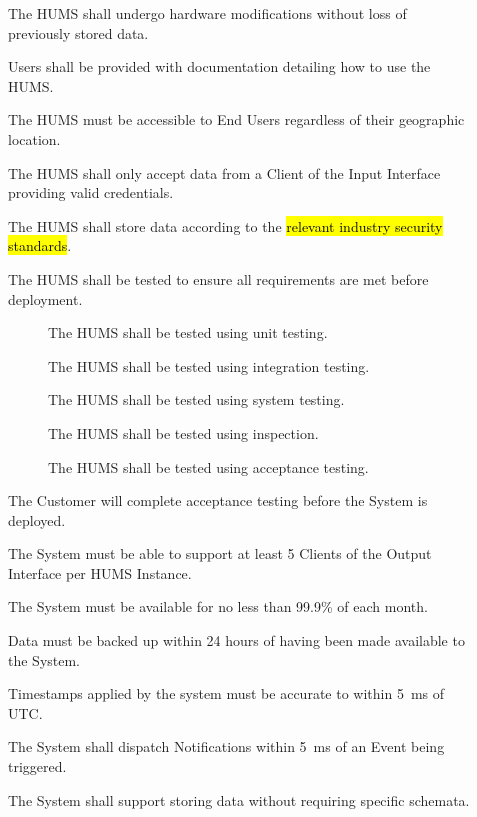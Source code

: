 \begin{description}
	\item[] The HUMS shall undergo hardware modifications without loss 
	of previously stored data.
	\item[] Users shall be provided with documentation detailing 
	how to use the HUMS.
	\item[] The HUMS must be accessible to End Users regardless of
	their geographic location.
	\item[]  The HUMS shall only accept data from a Client of the Input
	Interface providing valid credentials.
	\item[] The HUMS shall store data according to the \hl{relevant
	industry security standards}.
	\item[]  The HUMS shall be tested to ensure all requirements are 
	met before deployment.
	\begin{description}
	\item[]  The HUMS shall be tested using unit testing.
	\item[]  The HUMS shall be tested using integration testing.
	\item[]  The HUMS shall be tested using system testing.
	\item[]  The HUMS shall be tested using inspection.
	\item[]  The HUMS shall be tested using acceptance testing.
	\end{description}
	\item[] The Customer will complete acceptance testing before the 
	System is deployed.
	\item[] The System must be able to support at least 5 Clients of the 
	Output Interface per HUMS Instance. 
	\item[] The System must be available for no less than 99.9\% of 
	each month.
	\item[] Data must be backed up within 24 hours of having been 
	made available to the System.
	 \item[] Timestamps applied by the system must be accurate to 
	within 5~ms of UTC.
	\item[]  The System shall dispatch Notifications within 5~ms of an 
	Event being triggered.
	\item[] The System shall support storing data without requiring 
	specific schemata.
\end{description}

